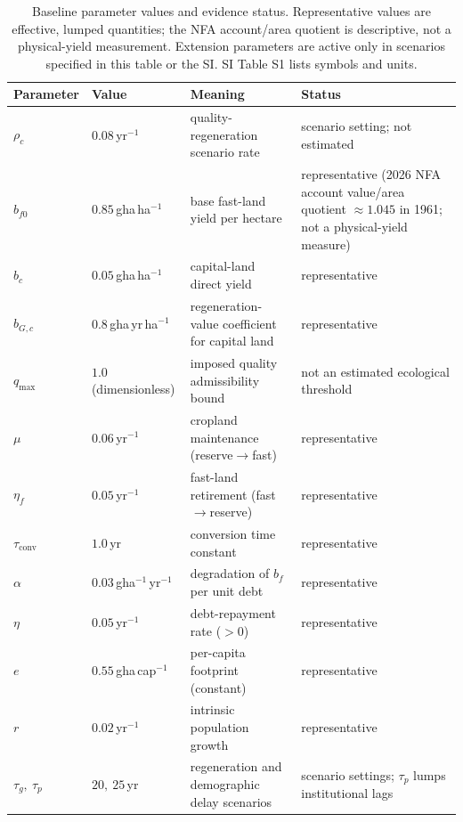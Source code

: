 \documentclass[preprint,12pt,authoryear]{elsarticle}
\newcommand{\tconv}{\tau_{\mathrm{conv}}}
\begin{document}
\begin{table}[!htbp]
\centering\footnotesize
\renewcommand{\arraystretch}{0.80}
\caption{Baseline parameter values and evidence status. Representative values are effective, lumped quantities; the NFA account/area quotient is descriptive, not a physical-yield measurement. Extension parameters are active only in scenarios specified in this table or the SI. SI Table S1 lists symbols and units.}
\label{tab:params}
\setlength{\tabcolsep}{4pt}
\begin{tabularx}{\textwidth}{@{}>{\raggedright\arraybackslash}p{} >{\raggedright\arraybackslash}p{} >{\raggedright\arraybackslash}X >{\raggedright\arraybackslash}p{}@{}}
\toprule
Parameter & Value & Meaning & Status \\
\midrule
$\rho_c$ & $0.08$\,yr$^{-1}$ & quality-regeneration scenario rate & scenario setting; not estimated \\
$b_{f0}$ & $0.85$\,gha\,ha$^{-1}$ & base fast-land yield per hectare & representative (2026 NFA account value/area quotient $\approx1.045$ in 1961; not a physical-yield measure) \\
$b_c$ & $0.05$\,gha\,ha$^{-1}$ & capital-land direct yield & representative \\
$b_{G,c}$ & $0.8$\,gha\,yr\,ha$^{-1}$ & regeneration-value coefficient for capital land & representative \\
$q_{\max}$ & $1.0$ (dimensionless) & imposed quality admissibility bound & not an estimated ecological threshold \\
$\mu$ & $0.06$\,yr$^{-1}$ & cropland maintenance (reserve$\to$fast) & representative \\
$\eta_f$ & $0.05$\,yr$^{-1}$ & fast-land retirement (fast$\to$reserve) & representative \\
$\tconv$ & $1.0$\,yr & conversion time constant & representative \\
$\alpha$ & $0.03$\,gha$^{-1}$\,yr$^{-1}$ & degradation of $b_f$ per unit debt & representative \\
$\eta$ & $0.05$\,yr$^{-1}$ & debt-repayment rate ($>0$) & representative \\
$e$ & $0.55$\,gha\,cap$^{-1}$ & per-capita footprint (constant) & representative \\
$r$ & $0.02$\,yr$^{-1}$ & intrinsic population growth & representative \\
$\tau_g,\ \tau_p$ & $20,\ 25$\,yr & regeneration and demographic delay scenarios & scenario settings; $\tau_p$ lumps institutional lags \\

\end{tabularx}
\end{table}
\end{document}
